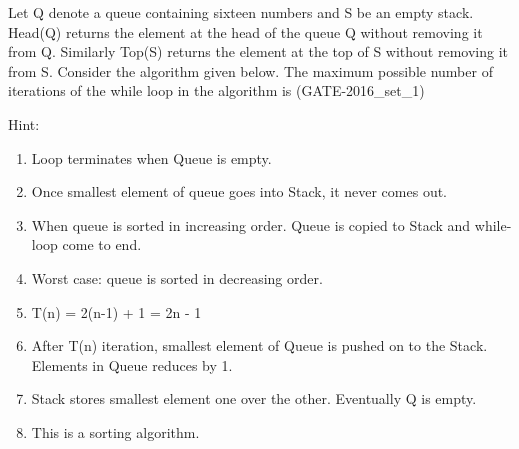 \begin{questyle}
  \question  Let Q denote a queue containing sixteen numbers and S be an empty stack. Head(Q) returns
            the element at the head of the queue Q without removing it from Q. Similarly Top(S) returns
            the element at the top of S without removing it from S. Consider the algorithm given below.
            The maximum possible number of iterations of the while loop in the algorithm is \fillin[256]   (GATE-2016\_set\_1)

          
  Hint:
  \begin{enumerate}
    \item Loop terminates when Queue is empty.
    \item Once smallest element of queue goes into Stack, it never comes out.
    \item When queue is sorted in increasing order. Queue is copied to Stack and while-loop come to end.
    \item Worst case: queue is sorted in decreasing order.
    \item T(n) = 2(n-1) + 1 = 2n - 1
    \item After T(n) iteration, smallest element of Queue is pushed on to the Stack. Elements in Queue reduces by 1.
    \item Stack stores smallest element one over the other. Eventually Q is empty.
    \item This is a sorting algorithm.
  \end{enumerate}

\end{questyle}

